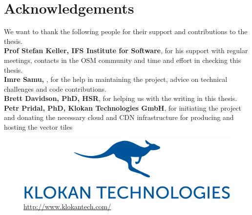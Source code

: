 

\bigskip


\begingroup

\let\clearpage\relax
\let\cleardoublepage\relax
\let\cleardoublepage\relax

\chapter*{Acknowledgements} %

We want to thank the following people for their support and contributions to the thesis.\\

\textbf{Prof Stefan Keller, IFS Institute for Software}, for his support with regular meetings, contacts in the OSM community and time and effort in checking this thesis.\\

\textbf{Imre Samu, \osm{}}, for the help in maintaining the project, advice on technical
challenges and code contributions.\\

\textbf{Brett Davidson, PhD, HSR}, for helping us with the writing in this thesis.\\

\textbf{Petr Pridal, PhD, Klokan Technologies GmbH}, for initiating the project and donating the necessary cloud and CDN infrastructure for producing and hosting the vector tiles\\

\begin{figure}[H]
  \centering
  \includegraphics[scale=0.3]{images/klokantech_logo.png}
  \caption*{\url{http://www.klokantech.com/}}
\end{figure}
\endgroup



